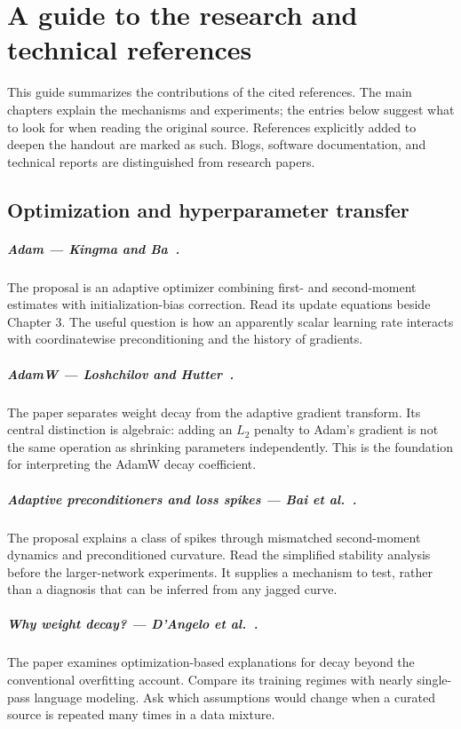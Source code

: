 \chapter{A guide to the research and technical references}
\label{app:reading}

This guide summarizes the contributions of the cited references. The main chapters explain the mechanisms and experiments; the entries below suggest what to look for when reading the original source. References explicitly added to deepen the handout are marked as such. Blogs, software documentation, and technical reports are distinguished from research papers.

\section{Optimization and hyperparameter transfer}
\paragraph{Adam --- Kingma and Ba~\cite{adam}.}
The proposal is an adaptive optimizer combining first- and second-moment estimates with initialization-bias correction. Read its update equations beside Chapter 3. The useful question is how an apparently scalar learning rate interacts with coordinatewise preconditioning and the history of gradients.

\paragraph{AdamW --- Loshchilov and Hutter~\cite{adamw}.}
The paper separates weight decay from the adaptive gradient transform. Its central distinction is algebraic: adding an $L_2$ penalty to Adam's gradient is not the same operation as shrinking parameters independently. This is the foundation for interpreting the AdamW decay coefficient.

\paragraph{Adaptive preconditioners and loss spikes --- Bai et al.~\cite{adamspikes}.}
The proposal explains a class of spikes through mismatched second-moment dynamics and preconditioned curvature. Read the simplified stability analysis before the larger-network experiments. It supplies a mechanism to test, rather than a diagnosis that can be inferred from any jagged curve.

\paragraph{Why weight decay? --- D'Angelo et al.~\cite{whywd}.}
The paper examines optimization-based explanations for decay beyond the conventional overfitting account. Compare its training regimes with nearly single-pass language modeling. Ask which assumptions would change when a curated source is repeated many times in a data mixture.

